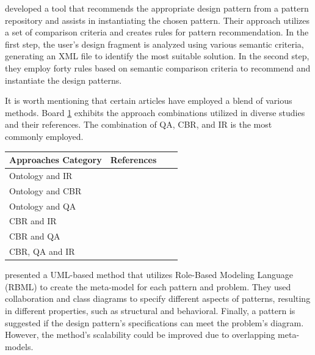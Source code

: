 \textcite{Bouassida2011} developed a tool that recommends the appropriate design pattern from a pattern repository and assists in instantiating the chosen pattern. Their approach utilizes a set of comparison criteria and creates rules for pattern recommendation. In the first step, the user's design fragment is analyzed using various semantic criteria, generating an XML file to identify the most suitable solution. In the second step, they employ forty rules based on semantic comparison criteria to recommend and instantiate the design patterns.


\label{subsec:combination-approach}


It is worth mentioning that certain articles have employed a blend of various methods. Board \ref{board:combined-approach} exhibits the approach combinations utilized in diverse studies and their references. The combination of QA, CBR, and IR is the most commonly employed.
 
\begin{table}[ht]
    \centering
    \small
    \label{board:combined-approach}
    \begin{tabular}{|l|p{.60\linewidth}|r|p{.01\linewidth}|} \hline
        \rowcolor{gray!19} \textbf{Approaches Category} & \textbf{References} \\ \hline
        Ontology and IR & \textcite{Bou2018, Laosen2020} \\
        \rowcolor{gray!19} Ontology and CBR & \textcite{Blomqvist2008} \\ 
        Ontology and QA & \textcite{Pavlivc2014} \\
        \rowcolor{gray!19} CBR and IR & \textcite{Muangon2009adaptation,Muangon2009analysis} \\ 
        CBR and QA & \textcite{Qureshi2017} \\
        \rowcolor{gray!19} CBR, QA and IR & \textcite{Sanyawong2014,Bouassida2015, Celikkan2019} \\ \hline 
    \end{tabular}
    \objectsource{\objectsourceauthor}
\end{table}
  
 \label{subsec:trade-offs-approaches}

\textcite{Kim2007} presented a UML-based method that utilizes Role-Based Modeling Language (RBML) to create the meta-model for each pattern and problem. They used collaboration and class diagrams to specify different aspects of patterns, resulting in different properties, such as structural and behavioral. Finally, a pattern is suggested if the design pattern's specifications can meet the problem's diagram. However, the method's scalability could be improved due to overlapping meta-models.

